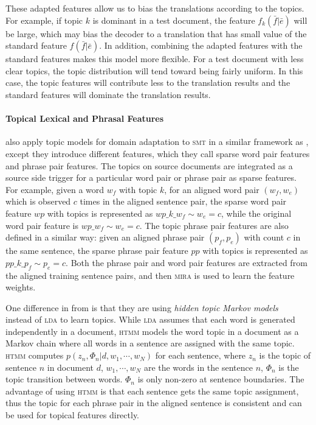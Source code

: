 These adapted features allow us to bias the translations according to the topics. For example, if topic $k$ is dominant in a test document, the feature $f_k(\bar{f} | \bar{e})$ will be large, which may bias the decoder to a translation that has small value of the standard feature $f(\bar{f}|\bar{e})$. In addition, combining the adapted features with the standard features makes this model more flexible. For a test document with less clear topics, the topic distribution will tend toward being fairly uniform. In this case, the topic features will contribute less to the translation results and the standard features will dominate the translation results.

\paragraph{Topical Lexical and Phrasal Features}

\citet{hasler-12} also apply topic models for domain adaptation to \textsc{smt} in a similar framework as \citet{Eidelman-12}, except they introduce different features, which they call sparse word pair features and phrase pair features. The topics on source documents are integrated as a source side trigger for a particular word pair or phrase pair as sparse features. For  example, given a word $w_f$ with topic $k$, for an aligned word pair $(w_f, w_e)$ which is observed $c$ times in the aligned sentence pair, the sparse word pair feature $wp$ with topics is represented as $wp\_k\_w_f \sim w_e = c$, while the original word pair feature is $wp\_w_f \sim w_e = c$. The topic phrase pair features are also defined in a similar way: given an aligned phrase pair $(p_f, p_e)$ with count $c$ in the same sentence, the sparse phrase pair feature $pp$ with topics is represented as $pp\_k\_p_f \sim p_e = c$. Both the phrase pair and word pair features are extracted from the aligned training sentence pairs, and then \textsc{mira} is used to learn the feature weights.

One difference in \citet{hasler-12} from \citet{Eidelman-12} is that they are using \emph{hidden topic Markov models}~\citep[\textsc{htmm}]{gruber-07} instead of \textsc{lda} to learn topics. While \textsc{lda} assumes that each word is generated independently in a document, \textsc{htmm} models the word topic in a document as a Markov chain where all words in a sentence are assigned with the same topic. \textsc{htmm} computes $p(z_n, \Phi_n | d, w_1, \cdots, w_N)$ for each sentence, where $z_n$ is the topic of sentence $n$ in document $d$, $w_1, \cdots, w_N$ are the words in the sentence $n$,  $\Phi_n$ is the topic transition between words. $\Phi_n$ is only non-zero at sentence boundaries. The advantage of using \textsc{htmm} is that each sentence gets the same topic assignment, thus the topic for each phrase pair in the aligned sentence is consistent and can be used for topical features directly. 

